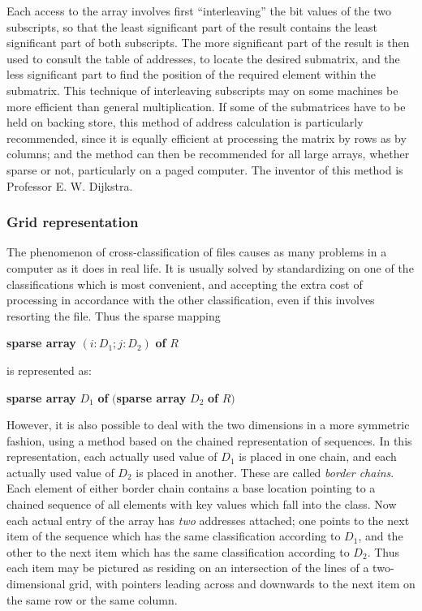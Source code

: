 Each access to the array involves first ``interleaving'' the bit values of the two subscripts, so that the least significant part of the result contains the least significant part of both subscripts. The more significant part of the result is then used to consult the table of addresses, to locate the desired submatrix, and the less significant part to find the position of the required element within the submatrix. This technique of interleaving subscripts may on some machines be more efficient than general multiplication. If some of the submatrices have to be held on backing store, this method of address calculation is particularly recommended, since it is equally efficient at processing the matrix by rows as by columns; and the method can then be recommended for all large arrays, whether sparse or not, particularly on a paged computer. The inventor of this method is Professor E. W. Dijkstra.

\subsubsection{Grid representation}

The phenomenon of cross-classification of files causes as many problems in a computer as it does in real life. It is usually solved by standardizing on one of the classifications which is most convenient, and accepting the extra cost of processing in accordance with the other classification, even if this involves resorting the file. Thus the sparse mapping

\quad \textbf{sparse array} $(i:D_1; j:D_2)$ \textbf{of} $R$

\noindent
is represented as:

\quad \textbf{sparse array} $D_1$ \textbf{of} $($\textbf{sparse array} $D_2$ \textbf{of} $R)$

However, it is also possible to deal with the two dimensions in a more symmetric fashion, using a method based on the chained representation of sequences. In this representation, each actually used value of $D_1$ is placed in one chain, and each actually used value of $D_2$ is placed in another. These are called \textit{border chains}. Each element of either border chain contains a base location pointing to a chained sequence of all elements with key values which fall into the class. Now each actual entry of the array has \textit{two} addresses attached; one points to the next item of the sequence which has the same classification according to $D_1$, and the other to the next item which has the same classification according to $D_2$. Thus each item may be pictured as residing on an intersection of the lines of a two-dimensional grid, with pointers leading across and downwards to the next item on the same row or the same column.

